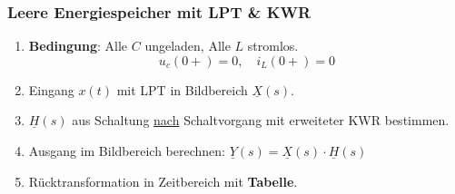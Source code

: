 \subsubsection{Leere Energiespeicher mit LPT \& KWR}
\begin{enumerate}
	\item \textbf{Bedingung}: Alle $C$ ungeladen, Alle $L$ stromlos.
	\[ 
	 u_c(0+)=0,\quad i_L(0+) = 0
	 \]

	\item Eingang $x(t)$ mit LPT in Bildbereich $\underline{X}(s)$.
    \item $\underline{H}(s)$ aus Schaltung \underline{nach}
        Schaltvorgang mit erweiteter KWR bestimmen.
    \item Ausgang im Bildbereich berechnen: $\underline{Y}(s) =
        \underline{X}(s)\cdot \underline{H}(s)$
    \item Rücktransformation in Zeitbereich mit \textbf{Tabelle}.
    
\end{enumerate}
